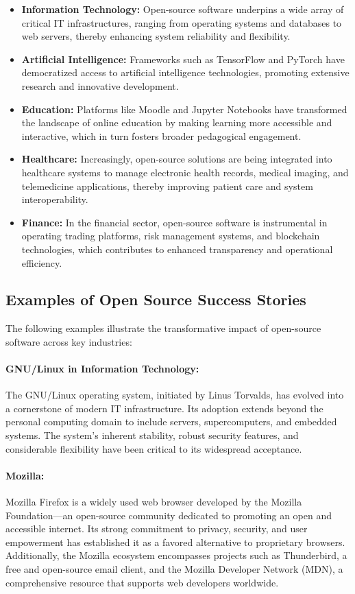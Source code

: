 \begin{itemize}
    \item \textbf{Information Technology:} Open-source software underpins a wide array of critical IT infrastructures, ranging from operating systems and databases to web servers, thereby enhancing system reliability and flexibility.
    \item \textbf{Artificial Intelligence:} Frameworks such as TensorFlow and PyTorch have democratized access to artificial intelligence technologies, promoting extensive research and innovative development.
    \item \textbf{Education:} Platforms like Moodle and Jupyter Notebooks have transformed the landscape of online education by making learning more accessible and interactive, which in turn fosters broader pedagogical engagement.
    \item \textbf{Healthcare:} Increasingly, open-source solutions are being integrated into healthcare systems to manage electronic health records, medical imaging, and telemedicine applications, thereby improving patient care and system interoperability.
    \item \textbf{Finance:} In the financial sector, open-source software is instrumental in operating trading platforms, risk management systems, and blockchain technologies, which contributes to enhanced transparency and operational efficiency.
\end{itemize}

\subsection{Examples of Open Source Success Stories}

The following examples illustrate the transformative impact of open-source software across key industries:

\paragraph{GNU/Linux in Information Technology:}  
The GNU/Linux operating system, initiated by Linus Torvalds, has evolved into a cornerstone of modern IT infrastructure. Its adoption extends beyond the personal computing domain to include servers, supercomputers, and embedded systems. The system’s inherent stability, robust security features, and considerable flexibility have been critical to its widespread acceptance.

\paragraph{Mozilla:}  
Mozilla Firefox is a widely used web browser developed by the Mozilla Foundation—an open-source community dedicated to promoting an open and accessible internet. Its strong commitment to privacy, security, and user empowerment has established it as a favored alternative to proprietary browsers. Additionally, the Mozilla ecosystem encompasses projects such as Thunderbird, a free and open-source email client, and the Mozilla Developer Network (MDN), a comprehensive resource that supports web developers worldwide.

